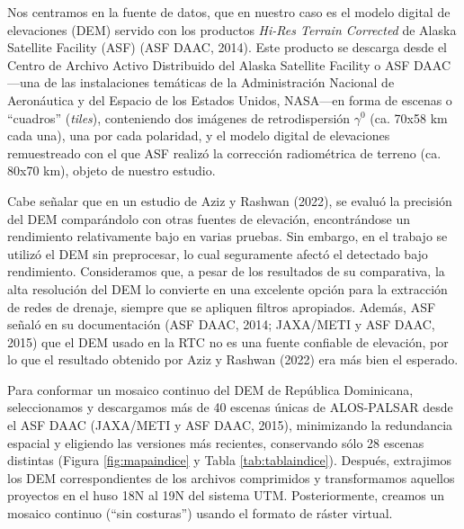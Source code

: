 \documentclass[spanish]{article}
\begin{document}
Nos centramos en la fuente de datos, que en nuestro caso es el modelo
digital de elevaciones (DEM) servido con los productos \emph{Hi-Res
Terrain Corrected} de Alaska Satellite Facility (ASF) (ASF DAAC, 2014).
Este producto se descarga desde el Centro de Archivo Activo Distribuido
del Alaska Satellite Facility o ASF DAAC---una de las instalaciones
temáticas de la Administración Nacional de Aeronáutica y del Espacio de
los Estados Unidos, NASA---en forma de escenas o ``cuadros''
(\emph{tiles}), conteniendo dos imágenes de retrodispersión \(\gamma^0\)
(ca. 70x58 km cada una), una por cada polaridad, y el modelo digital de
elevaciones remuestreado con el que ASF realizó la corrección
radiométrica de terreno (ca. 80x70 km), objeto de nuestro estudio.

Cabe señalar que en un estudio de Aziz y Rashwan (2022), se evaluó la
precisión del DEM comparándolo con otras fuentes de elevación,
encontrándose un rendimiento relativamente bajo en varias pruebas. Sin
embargo, en el trabajo se utilizó el DEM sin preprocesar, lo cual
seguramente afectó el detectado bajo rendimiento. Consideramos que, a
pesar de los resultados de su comparativa, la alta resolución del DEM lo
convierte en una excelente opción para la extracción de redes de
drenaje, siempre que se apliquen filtros apropiados. Además, ASF señaló
en su documentación (ASF DAAC, 2014; JAXA/METI y ASF DAAC, 2015) que el
DEM usado en la RTC no es una fuente confiable de elevación, por lo que
el resultado obtenido por Aziz y Rashwan (2022) era más bien el
esperado.

Para conformar un mosaico continuo del DEM de República Dominicana,
seleccionamos y descargamos más de 40 escenas únicas de ALOS-PALSAR
desde el ASF DAAC (JAXA/METI y ASF DAAC, 2015), minimizando la
redundancia espacial y eligiendo las versiones más recientes,
conservando sólo 28 escenas distintas (Figura \ref{fig:mapaindice} y
Tabla \ref{tab:tablaindice}). Después, extrajimos los DEM
correspondientes de los archivos comprimidos y transformamos aquellos
proyectos en el huso 18N al 19N del sistema UTM. Posteriormente, creamos
un mosaico continuo (``sin costuras'') usando el formato de ráster
virtual.
\end{document}
